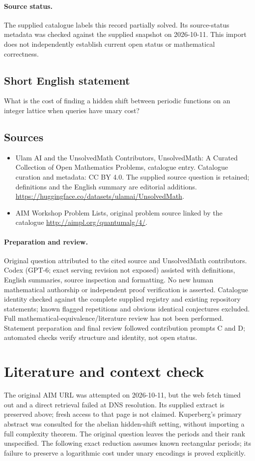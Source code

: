 \documentclass[11pt]{article}
\begin{document}
\paragraph{Source status.}
The supplied catalogue labels this record partially solved. Its source-status metadata was checked against the supplied snapshot on 2026-10-11. This import does not independently establish current open status or mathematical correctness.
\subsection{Short English statement}
What is the cost of finding a hidden shift between periodic functions on an integer lattice when queries have unary cost?
\subsection{Sources}
\begin{itemize}
\item[S1] Ulam AI and the UnsolvedMath Contributors, UnsolvedMath: A Curated Collection of Open Mathematics Problems, catalogue entry. Catalogue curation and metadata: CC BY 4.0. The supplied source question is retained; definitions and the English summary are editorial additions.
\url{https://huggingface.co/datasets/ulamai/UnsolvedMath}.
\item[S2] AIM Workshop Problem Lists, original problem source linked by the catalogue
\url{http://aimpl.org/quantumalg/4/}.
\end{itemize}
\paragraph{Preparation and review.}
Original question attributed to the cited source and UnsolvedMath contributors. Codex (GPT-6; exact serving revision not exposed) assisted with definitions, English summaries, source inspection and formatting. No new human mathematical authorship or independent proof verification is asserted. Catalogue identity checked against the complete supplied registry and existing repository statements; known flagged repetitions and obvious identical conjectures excluded. Full mathematical-equivalence/literature review has not been performed. Statement preparation and final review followed contribution prompts C and D; automated checks verify structure and identity, not open status.
\label{end:statement}

\section{Literature and context check}
The original AIM URL was attempted on 2026-10-11, but the web fetch timed out and a direct retrieval failed at DNS resolution. Its supplied extract is preserved above; fresh access to that page is not claimed. Kuperberg's primary abstract was consulted for the abelian hidden-shift setting, without importing a full complexity theorem. The original question leaves the periods and their rank unspecified. The following exact reduction assumes known rectangular periods; its failure to preserve a logarithmic cost under unary encodings is proved explicitly.
\end{document}
